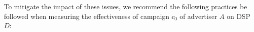 \documentclass[11pt,a4paper]{article}
\theoremstyle{definition}
\theoremstyle{remark}
\theoremstyle{definition}
\theoremstyle{definition}
\theoremstyle{definition}
\theoremstyle{definition}
\theoremstyle{definition}
\theoremstyle{definition}
\begin{document}



To mitigate the impact of these issues, we recommend the following practices be followed when measuring the effectiveness of campaign $c_0$ of advertiser $A$ on DSP $D$:
\end{document}

